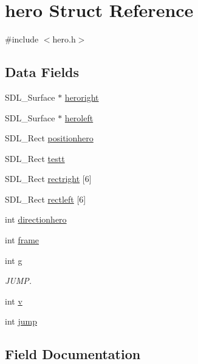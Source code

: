 \hypertarget{structhero}{}\section{hero Struct Reference}
\label{structhero}


{\ttfamily \#include $<$hero.\+h$>$}

\subsection*{Data Fields}
\begin{DoxyCompactItemize}
\item 
S\+D\+L\+\_\+\+Surface $\ast$ \hyperlink{structhero_a93cb673f8b54b6f7b365eb1fe22cbd91}{heroright}
\item 
S\+D\+L\+\_\+\+Surface $\ast$ \hyperlink{structhero_ac9349d1cfe5da7b8d52892f7eba3edb9}{heroleft}
\item 
S\+D\+L\+\_\+\+Rect \hyperlink{structhero_ac00c690d14ead4118a92d604f8885761}{positionhero}
\item 
S\+D\+L\+\_\+\+Rect \hyperlink{structhero_a5087f6cc23af7165275189406050fce5}{testt}
\item 
S\+D\+L\+\_\+\+Rect \hyperlink{structhero_a696a0a143c37c32c2cf037464a103f22}{rectright} \mbox{[}6\mbox{]}
\item 
S\+D\+L\+\_\+\+Rect \hyperlink{structhero_aac84e4428f223985f0c57f83ef7e5e56}{rectleft} \mbox{[}6\mbox{]}
\item 
int \hyperlink{structhero_aab107c0e79485d866f6903fdefe340bc}{directionhero}
\item 
int \hyperlink{structhero_a8affba68a94772ef439a2ee68b244ff8}{frame}
\item 
int \hyperlink{structhero_a913f57781151e585e18018cd8249d871}{g}
\begin{DoxyCompactList}\small\item\em J\+U\+MP. \end{DoxyCompactList}\item 
int \hyperlink{structhero_a42f83a5a147475aa2fa73a5ff07d2e89}{v}
\item 
int \hyperlink{structhero_ab02ce82098eb82b0c3be544f4624113f}{jump}
\end{DoxyCompactItemize}


\subsection{Field Documentation}
\mbox{\label{structhero_aab107c0e79485d866f6903fdefe340bc}} 
